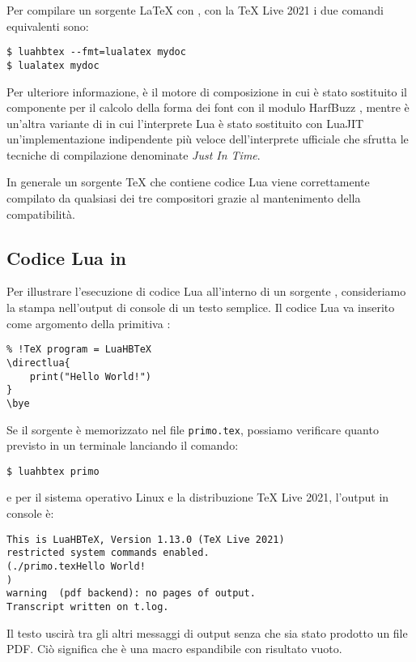 Per compilare un sorgente \LaTeX{} con \LuaLaTeX{}, con la TeX Live 2021 i due
comandi equivalenti sono:
\begin{Verbatim}[numbers=none]
$ luahbtex --fmt=lualatex mydoc
$ lualatex mydoc
\end{Verbatim}

Per ulteriore informazione,  è il motore di composizione
 in cui è stato sostituito il componente per il calcolo della forma
dei font con il modulo HarfBuzz \cite{lib:harfbuzz}, mentre  è
un'altra variante di  in cui l'interprete Lua è stato sostituito
con LuaJIT \cite{prg:luajit} un'implementazione indipendente più veloce
dell'interprete ufficiale che sfrutta le tecniche di compilazione denominate
\emph{Just In Time}.

In generale un sorgente \TeX{} che contiene codice Lua viene correttamente
compilato da qualsiasi dei tre compositori grazie al mantenimento della
compatibilità.


\subsection{Codice Lua in \LuaTeX}

Per illustrare l'esecuzione di codice Lua all'interno di un sorgente \LuaTeX,
consideriamo la stampa nell'output di console di un testo semplice. Il codice
Lua va inserito come argomento della primitiva :
\begin{Verbatim}
% !TeX program = LuaHBTeX
\directlua{
    print("Hello World!")
}
\bye
\end{Verbatim}

Se il sorgente è memorizzato nel file \texttt{primo.tex}, possiamo verificare
quanto previsto in un terminale lanciando il comando:
\begin{Verbatim}[numbers=none]
$ luahbtex primo
\end{Verbatim}
e per il sistema operativo Linux e la distribuzione TeX Live 2021, l'output
in console è:
\begin{Verbatim}
This is LuaHBTeX, Version 1.13.0 (TeX Live 2021) 
restricted system commands enabled.
(./primo.texHello World!
)
warning  (pdf backend): no pages of output.
Transcript written on t.log.  
\end{Verbatim}

Il testo uscirà tra gli altri messaggi di output senza che sia stato prodotto un
file PDF. Ciò significa che  è una macro espandibile con risultato
vuoto.


